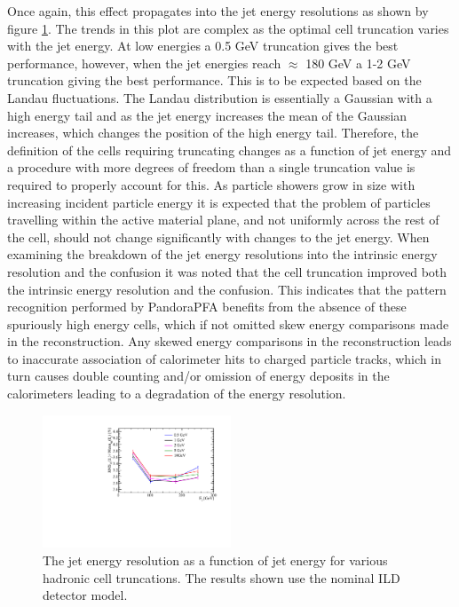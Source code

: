 Once again, this effect propagates into the jet energy resolutions as shown by figure \ref{fig:jercelltrunc}.  The trends in this plot are complex as the optimal cell truncation varies with the jet energy.  At low energies a 0.5 GeV truncation gives the best performance, however, when the jet energies reach $\approx$ 180 GeV a 1-2 GeV truncation giving the best performance.  This is to be expected based on the Landau fluctuations.  The Landau distribution is essentially a Gaussian with a high energy tail and as the jet energy increases the mean of the Gaussian increases, which changes the position of the high energy tail.  Therefore, the definition of the cells requiring truncating changes as a function of jet energy and a procedure with more degrees of freedom than a single truncation value is required to properly account for this.  As particle showers grow in size with increasing incident particle energy it is expected that the problem of particles travelling within the active material plane, and not uniformly across the rest of the cell, should not change significantly with changes to the jet energy.  When examining the breakdown of the jet energy resolutions into the intrinsic energy resolution and the confusion it was noted that the cell truncation improved both the intrinsic energy resolution and the confusion.  This indicates that the pattern recognition performed by PandoraPFA benefits from the absence of these spuriously high energy cells, which if not omitted skew energy comparisons made in the reconstruction.  Any skewed energy comparisons in the reconstruction leads to inaccurate association of calorimeter hits to charged particle tracks, which in turn causes double counting and/or omission of energy deposits in the calorimeters leading to a degradation of the energy resolution.  

\begin{figure}
\includegraphics[width=0.5\textwidth]{EnergyEstimators/Plots/CellTruncation/JER_vs_JetEnergy_HCalCellTruncation.pdf}
\caption[The jet energy resolution as a function of jet energy for various hadronic cell truncations.  The results shown use the nominal ILD detector model.]{The jet energy resolution as a function of jet energy for various hadronic cell truncations.  The results shown use the nominal ILD detector model.}
\label{fig:jercelltrunc}
\end{figure}

